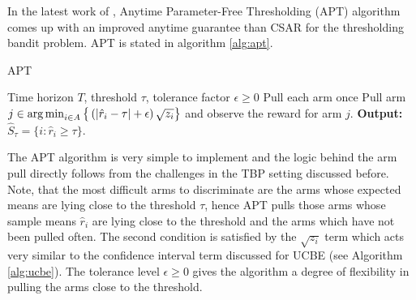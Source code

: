 In the latest work of \citet{locatelli2016optimal}, Anytime Parameter-Free Thresholding (APT) algorithm comes up with an improved anytime guarantee than CSAR for the thresholding bandit problem. APT is stated in algorithm \ref{alg:apt}. 

\begin{algorithm}[!th]
\caption{APT}
\label{alg:apt}
\begin{algorithmic}
 Time horizon $T$, threshold $\tau$, tolerance factor $\epsilon\geq 0$
\State Pull each arm once
\State {}
\State Pull arm $j\in\operatorname*{arg\,min}_{i\in A}\big\lbrace \left(|\hat{r}_{i} - \tau | + \epsilon\right)\sqrt{z_i}\big\rbrace$ and observe the reward for arm $j$.
\EndFor
\State \textbf{Output:} $\hat{S}_{\tau}=\lbrace i: \hat{r}_{i}\geq \tau \rbrace$.
\end{algorithmic}
\end{algorithm}

The APT algorithm is very simple to implement and the logic behind the arm pull directly follows from the challenges in the TBP setting discussed before. Note, that the most difficult arms to discriminate are the arms whose expected means are lying close to the threshold $\tau$, hence APT pulls those arms whose sample means $\hat{r}_i$ are lying close to the threshold and the arms which have not been pulled often. The second condition is satisfied by the $\sqrt{z_i}$ term which acts very similar to the confidence interval term discussed for UCBE (see Algorithm \ref{alg:ucbe}). The tolerance level $\epsilon\geq 0$ gives the algorithm a degree of flexibility in pulling the arms close to the threshold.